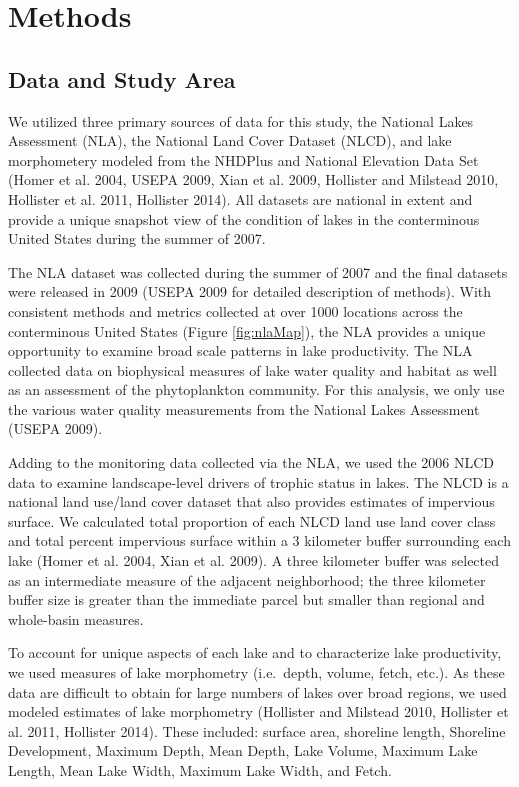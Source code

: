 \documentclass[12pt,]{article}
\begin{document}
\section{Methods}\label{methods}

\subsection{Data and Study Area}\label{data-and-study-area}

We utilized three primary sources of data for this study, the National
Lakes Assessment (NLA), the National Land Cover Dataset (NLCD), and lake
morphometery modeled from the NHDPlus and National Elevation Data Set
(Homer et al. 2004, USEPA 2009, Xian et al. 2009, Hollister and Milstead
2010, Hollister et al. 2011, Hollister 2014). All datasets are national
in extent and provide a unique snapshot view of the condition of lakes
in the conterminous United States during the summer of 2007.

The NLA dataset was collected during the summer of 2007 and the final
datasets were released in 2009 (USEPA 2009 for detailed description of
methods). With consistent methods and metrics collected at over 1000
locations across the conterminous United States (Figure
\ref{fig:nlaMap}), the NLA provides a unique opportunity to examine
broad scale patterns in lake productivity. The NLA collected data on
biophysical measures of lake water quality and habitat as well as an
assessment of the phytoplankton community. For this analysis, we only
use the various water quality measurements from the National Lakes
Assessment (USEPA 2009).

Adding to the monitoring data collected via the NLA, we used the 2006
NLCD data to examine landscape-level drivers of trophic status in lakes.
The NLCD is a national land use/land cover dataset that also provides
estimates of impervious surface. We calculated total proportion of each
NLCD land use land cover class and total percent impervious surface
within a 3 kilometer buffer surrounding each lake (Homer et al. 2004,
Xian et al. 2009). A three kilometer buffer was selected as an
intermediate measure of the adjacent neighborhood; the three kilometer
buffer size is greater than the immediate parcel but smaller than
regional and whole-basin measures.

To account for unique aspects of each lake and to characterize lake
productivity, we used measures of lake morphometry (i.e.~depth, volume,
fetch, etc.). As these data are difficult to obtain for large numbers of
lakes over broad regions, we used modeled estimates of lake morphometry
(Hollister and Milstead 2010, Hollister et al. 2011, Hollister 2014).
These included: surface area, shoreline length, Shoreline Development,
Maximum Depth, Mean Depth, Lake Volume, Maximum Lake Length, Mean Lake
Width, Maximum Lake Width, and Fetch.
\end{document}
